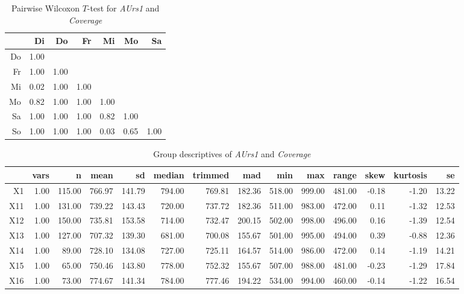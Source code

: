 \begin{table}[ht]
	\small
	\centering
    \begin{tabular}{rrrrrrr}
		\hline
		& Di & Do & Fr & Mi & Mo & Sa \\ 
		\hline
		Do & 1.00 &  &  &  &  &  \\ 
		Fr & 1.00 & 1.00 &  &  &  &  \\ 
		Mi & 0.02 & 1.00 & 1.00 &  &  &  \\ 
		Mo & 0.82 & 1.00 & 1.00 & 1.00 &  &  \\ 
		Sa & 1.00 & 1.00 & 1.00 & 0.82 & 1.00 &  \\ 
		So & 1.00 & 1.00 & 1.00 & 0.03 & 0.65 & 1.00 \\ 
		\hline
	\end{tabular}
    \caption{Pairwise Wilcoxon $T$-test for \textit{AUrs1} and \textit{Coverage}}
    \label{tbl:wilcoxon_baysis_effector_AUrs1_Cov}
\end{table}
\begin{table}[ht]
	\small
	\centering
    \begin{tabular}{rrrrrrrrrrrrrr}
		\hline
		& vars & n & mean & sd & median & trimmed & mad & min & max & range & skew & kurtosis & se \\ 
		\hline
		X1 & 1.00 & 115.00 & 766.97 & 141.79 & 794.00 & 769.81 & 182.36 & 518.00 & 999.00 & 481.00 & -0.18 & -1.20 & 13.22 \\ 
		X11 & 1.00 & 131.00 & 739.22 & 143.43 & 720.00 & 737.72 & 182.36 & 511.00 & 983.00 & 472.00 & 0.11 & -1.32 & 12.53 \\ 
		X12 & 1.00 & 150.00 & 735.81 & 153.58 & 714.00 & 732.47 & 200.15 & 502.00 & 998.00 & 496.00 & 0.16 & -1.39 & 12.54 \\ 
		X13 & 1.00 & 127.00 & 707.32 & 139.30 & 681.00 & 700.08 & 155.67 & 501.00 & 995.00 & 494.00 & 0.39 & -0.88 & 12.36 \\ 
		X14 & 1.00 & 89.00 & 728.10 & 134.08 & 727.00 & 725.11 & 164.57 & 514.00 & 986.00 & 472.00 & 0.14 & -1.19 & 14.21 \\ 
		X15 & 1.00 & 65.00 & 750.46 & 143.80 & 778.00 & 752.32 & 155.67 & 507.00 & 988.00 & 481.00 & -0.23 & -1.29 & 17.84 \\ 
		X16 & 1.00 & 73.00 & 774.67 & 141.34 & 784.00 & 777.46 & 194.22 & 534.00 & 994.00 & 460.00 & -0.14 & -1.22 & 16.54 \\ 
		\hline
	\end{tabular}
    \caption{Group descriptives of \textit{AUrs1} and \textit{Coverage}}
    \label{tbl:descriptives_baysis_effector_AUrs1_Cov}
\end{table}

